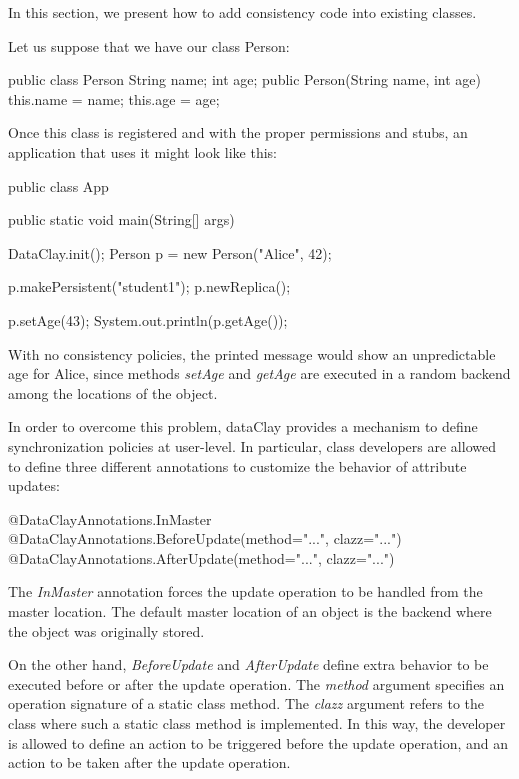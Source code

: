 In this section, we present how to add consistency code into existing classes.

Let us suppose that we have our class Person:

\begin{tBox}
\begin{java}
public class Person {
  String name;
  int age;
  public Person(String name, int age) {
    this.name = name;
    this.age = age;
  }
}
\end{java}
\end{tBox}

Once this class is registered and with the proper permissions and stubs, an application that uses it might look like this:

\begin{tBox}
\begin{java}
public class App {
  public static void main(String[] args) {
    DataClay.init();
    Person p = new Person("Alice", 42);
    
    p.makePersistent("student1");
    p.newReplica();
    
    p.setAge(43);
    System.out.println(p.getAge());
  }
}
\end{java}
\end{tBox}

With no consistency policies, the printed message would show an unpredictable age for Alice, since methods \textit{setAge} and \textit{getAge} are executed in a random backend among the locations of the object.

In order to overcome this problem, dataClay provides a mechanism to define synchronization policies at user-level. In particular, class developers are allowed to define three different annotations to customize the behavior of attribute updates:

\begin{tBox}
\begin{java}
    @DataClayAnnotations.InMaster
    @DataClayAnnotations.BeforeUpdate(method="...", clazz="...")
    @DataClayAnnotations.AfterUpdate(method="...", clazz="...")
\end{java}
\end{tBox}

The \textit{InMaster} annotation forces the update operation to be handled from the master location. The default master location of an object is the backend where the object was originally stored.

On the other hand, \textit{BeforeUpdate} and \textit{AfterUpdate} define extra behavior to be executed before or after the update operation. The \textit{method} argument specifies an operation signature of a static class method. The \textit{clazz} argument refers to the class where such a static class method is implemented. In this way, the developer is allowed to define an action to be triggered before the update operation, and an action to be taken after the update operation.

